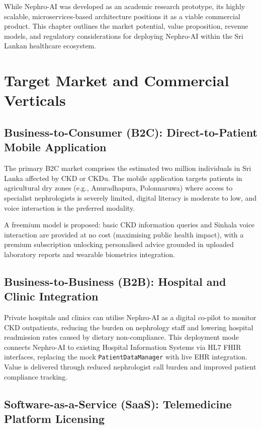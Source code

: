 \documentclass[12pt,a4paper]{report}
\begin{document}
While Nephro-AI was developed as an academic research prototype, its highly scalable, microservices-based architecture positions it as a viable commercial product. This chapter outlines the market potential, value proposition, revenue models, and regulatory considerations for deploying Nephro-AI within the Sri Lankan healthcare ecosystem.

\section{Target Market and Commercial Verticals}

\subsection{Business-to-Consumer (B2C): Direct-to-Patient Mobile Application}

The primary B2C market comprises the estimated two million individuals in Sri Lanka affected by CKD or CKDu. The mobile application targets patients in agricultural dry zones (e.g., Anuradhapura, Polonnaruwa) where access to specialist nephrologists is severely limited, digital literacy is moderate to low, and voice interaction is the preferred modality.

A freemium model is proposed: basic CKD information queries and Sinhala voice interaction are provided at no cost (maximising public health impact), with a premium subscription unlocking personalised advice grounded in uploaded laboratory reports and wearable biometrics integration.

\subsection{Business-to-Business (B2B): Hospital and Clinic Integration}

Private hospitals and clinics can utilise Nephro-AI as a digital co-pilot to monitor CKD outpatients, reducing the burden on nephrology staff and lowering hospital readmission rates caused by dietary non-compliance. This deployment mode connects Nephro-AI to existing Hospital Information Systems via HL7 FHIR interfaces, replacing the mock \texttt{PatientDataManager} with live EHR integration. Value is delivered through reduced nephrologist call burden and improved patient compliance tracking.

\subsection{Software-as-a-Service (SaaS): Telemedicine Platform Licensing}
\end{document}
